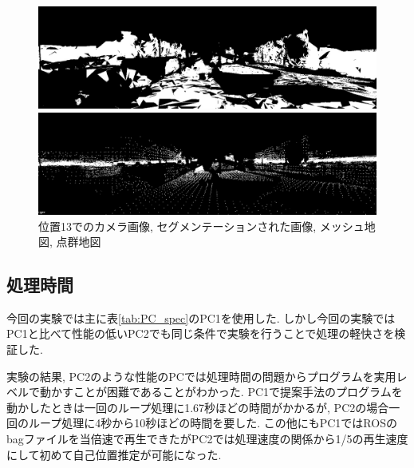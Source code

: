 \begin{figure}[htbp]
\begin{minipage}[b]{0.50\hsize}
\begin{center}
  \end{center}
 \end{minipage} \\
   \begin{minipage}[b]{0.50\hsize}
 \begin{center}
  \includegraphics[keepaspectratio, scale=0.18]{./picture/valued_mesh_map_image/image12.jpg}
  \end{center}
 \end{minipage}
 \begin{minipage}[b]{0.50\hsize}
 \begin{center}
  \includegraphics[keepaspectratio, scale=0.18]{./picture/valued_point_map_image/image12.jpg}
  \end{center}
 \end{minipage}
 \caption{位置13でのカメラ画像, セグメンテーションされた画像, メッシュ地図, 点群地図}\label{fig:place13}
\end{figure}

\newpage

\subsection{処理時間}\label{sec:span_time_result}
今回の実験では主に表\ref{tab:PC_spec}のPC1を使用した. しかし今回の実験ではPC1と比べて性能の低いPC2でも同じ条件で実験を行うことで処理の軽快さを検証した. \par 実験の結果, PC2のような性能のPCでは処理時間の問題からプログラムを実用レベルで動かすことが困難であることがわかった. PC1で提案手法のプログラムを動かしたときは一回のループ処理に1.67秒ほどの時間がかかるが, PC2の場合一回のループ処理に4秒から10秒ほどの時間を要した. この他にもPC1ではROSのbagファイルを当倍速で再生できたがPC2では処理速度の関係から1/5の再生速度にして初めて自己位置推定が可能になった.

